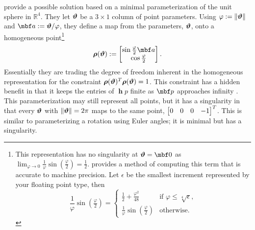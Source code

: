 \documentclass[11pt,a4,oneside]{article}
\begin{document}
\citet{Hartley0001} provide a possible solution based on a minimal parameterization of the unit sphere in $\mathbb R^4$. They let ${\boldsymbol{\vartheta}}$ be a $3 \times 1$ column of point parameters. Using $\varphi := \left\Vert{\boldsymbol{\vartheta}}\right\Vert$ and $\mbf a := \mbs \vartheta / \varphi$, they define a map from the parameters, ${\boldsymbol{\vartheta}}$,  onto a homogeneous point\footnote{This representation has no singularity at $\mbs \vartheta = \mbf 0$ as ${\displaystyle \lim_{\varphi\rightarrow 0}} \frac{1}{\varphi}\sin\left( \tfrac{\varphi}{2} \right) = \tfrac{1}{2}$. \citet{Grassia9800} provides a method of computing this term that is accurate to machine precision. Let $\epsilon$ be the smallest increment represented by your floating point type, then
\begin{equation*}
  \frac{1}{\varphi}\sin\left( \tfrac{\varphi}{2} \right) = 
    \begin{cases}
       \tfrac{1}{2} + \tfrac{\varphi^2}{48}    & \text{if $\varphi \le \sqrt[4]{\epsilon}$},\\
       \frac{1}{\varphi}\sin\left(\tfrac{\varphi}{2}\right) & \text{otherwise}.
    \end{cases}
\end{equation*}}
\begin{equation}
  \label{eq:hartley-map}
  \mbs \rho(\mbs \vartheta) := 
    \bbm 
      \sin\tfrac{\varphi}{2} \mbf a \\
      \cos\tfrac{\varphi}{2}
    \ebm.
\end{equation}
Essentially they are trading the degree of freedom inherent in the homogeneous representation for the constraint ${\boldsymbol{\rho}}({\boldsymbol{\vartheta}})^T {\boldsymbol{\rho}}( {\boldsymbol{\vartheta}}) = 1$. This constraint has a hidden benefit in that it keeps the entries of $\mbfh p$ finite as $\mbf p$ approaches infinity \citep{Triggs0000}. This parameterization may still represent all points, but it has a singularity in that every ${\boldsymbol{\vartheta}}$ with $\left\Vert{\boldsymbol{\vartheta}}\right\Vert = 2 \pi$ maps to the same point, $\begin{bmatrix} 0 & 0 & 0 & -1 \end{bmatrix}^T$. This is similar to parameterizing a rotation using Euler angles; it is minimal but has a singularity. 
\end{document}
